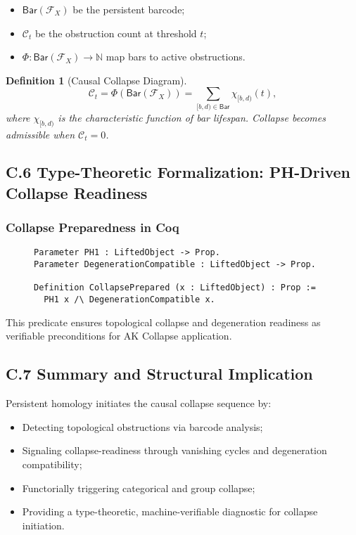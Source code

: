 \documentclass[11pt]{article}
\newtheorem{definition}[theorem]{Definition}
\begin{document}
\begin{itemize}
    \item \( \mathsf{Bar}(\mathcal{F}_X) \) be the persistent barcode;
    \item \( \mathcal{C}_t \) be the obstruction count at threshold \( t \);
    \item \( \Phi : \mathsf{Bar}(\mathcal{F}_X) \to \mathbb{N} \) map bars to active obstructions.
\end{itemize}

\begin{definition}[Causal Collapse Diagram]
\[
\mathcal{C}_t = \Phi(\mathsf{Bar}(\mathcal{F}_X)) = \sum_{[b,d) \in \mathsf{Bar}} \chi_{[b,d)}(t),
\]
where \( \chi_{[b,d)} \) is the characteristic function of bar lifespan. Collapse becomes admissible when \( \mathcal{C}_t = 0 \).
\end{definition}

\subsection*{C.6 Type-Theoretic Formalization: PH-Driven Collapse Readiness}

\subsubsection*{Collapse Preparedness in Coq}

\begin{figure}[h]
\centering
\begin{lstlisting}[language=Coq, caption=Persistent Homology Driven Collapse Readiness]
Parameter PH1 : LiftedObject -> Prop.
Parameter DegenerationCompatible : LiftedObject -> Prop.

Definition CollapsePrepared (x : LiftedObject) : Prop :=
  PH1 x /\ DegenerationCompatible x.
\end{lstlisting}
\end{figure}

This predicate ensures topological collapse and degeneration readiness as verifiable preconditions for AK Collapse application.

\subsection*{C.7 Summary and Structural Implication}

Persistent homology initiates the causal collapse sequence by:

\begin{itemize}
    \item Detecting topological obstructions via barcode analysis;
    \item Signaling collapse-readiness through vanishing cycles and degeneration compatibility;
    \item Functorially triggering categorical and group collapse;
    \item Providing a type-theoretic, machine-verifiable diagnostic for collapse initiation.
\end{itemize}
\end{document}
